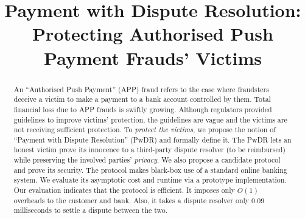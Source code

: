 \documentclass[orivec]{llncs}
\begin{document}
\title{Payment with Dispute Resolution: \\Protecting Authorised Push Payment Frauds' Victims}
\author{}
\institute{}

\date{}
\maketitle{}


\begin{abstract}
An ``Authorised Push Payment'' (APP) fraud refers to the case where  fraudsters deceive a victim  to make  a payment  to a bank account controlled by them.  Total financial loss due to  APP frauds is swiftly growing. Although  regulators   provided guidelines to  improve victims’ protection, the guidelines are  vague and  the victims are not receiving sufficient protection. To \emph{protect the  victims},  we propose the notion of ``Payment with Dispute Resolution'' (PwDR) and formally define it. The PwDR lets an honest victim  prove its innocence to a third-party dispute resolver  (to be reimbursed) while preserving the involved parties' \emph{privacy}. We also propose a  candidate protocol  and  prove its security. The protocol  makes black-box use of a standard online banking system. We evaluate its    asymptotic cost and   runtime  via a prototype implementation. Our evaluation indicates that the protocol is  efficient. It imposes only $O(1)$ overheads to the customer and bank.  Also, it takes  a dispute resolver  only $0.09$ milliseconds to  settle a dispute between the two.
\end{abstract}












\appendix






\end{document}
